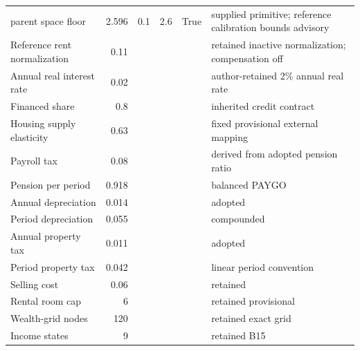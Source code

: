 \begin{tabularx}{\linewidth}{XrXXXX}
parent space floor & 2.596 & 0.1 & 2.6 & True & supplied primitive; reference calibration bounds advisory \\
Reference rent normalization & 0.11 &  &  &  & retained inactive normalization; compensation off \\
Annual real interest rate & 0.02 &  &  &  & author-retained 2\% annual real rate \\
Financed share & 0.8 &  &  &  & inherited credit contract \\
Housing supply elasticity & 0.63 &  &  &  & fixed provisional external mapping \\
Payroll tax & 0.08 &  &  &  & derived from adopted pension ratio \\
Pension per period & 0.918 &  &  &  & balanced PAYGO \\
Annual depreciation & 0.014 &  &  &  & adopted \\
Period depreciation & 0.055 &  &  &  & compounded \\
Annual property tax & 0.011 &  &  &  & adopted \\
Period property tax & 0.042 &  &  &  & linear period convention \\
Selling cost & 0.06 &  &  &  & retained \\
Rental room cap & 6 &  &  &  & retained provisional \\
Wealth-grid nodes & 120 &  &  &  & retained exact grid \\
Income states & 9 &  &  &  & retained B15 \\
\bottomrule
\end{tabularx}
\endgroup
